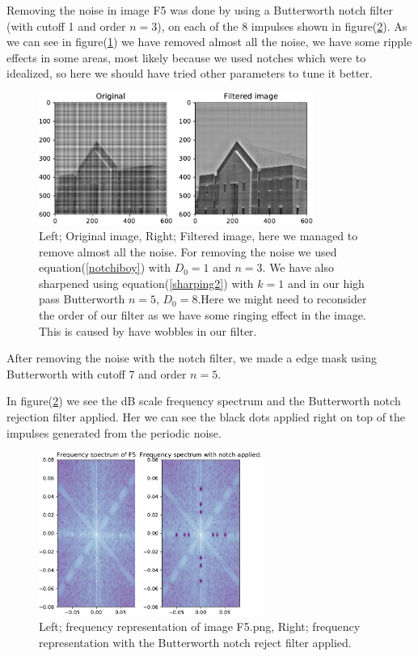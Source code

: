 {Removing the noise in image F5 was done by using a Butterworth notch filter (with cutoff 1 and order $n = 3$), on each of the 8 impulses shown in figure(\ref{F5notch}). As we can see in figure(\ref{C7F5}) we have removed almost all the noise, we have some ripple effects in some areas, most likely because we used notches which were to idealized, so here we should have tried other parameters to tune it better.


\begin{figure}[!htb]
    {\centering
        \includegraphics[width=0.80\textwidth]{C7F5.pdf}
        \caption{Left; Original image, Right; Filtered image, here we managed to remove almost all the noise. For removing the noise we used equation(\ref{notchiboy}) with $D_{0} = 1$ and $n = 3$. We have also sharpened using equation(\ref{sharping2}) with $k = 1$ and in our high pass Butterworth $n = 5$, $D_{0} = 8$.Here we might need to reconsider the order of our filter as we have some ringing effect in the image. This is caused by have wobbles in our filter.}
        \label{C7F5}
    \par}
    \end{figure}

After removing the noise with the notch filter, we made a edge mask using Butterworth with cutoff 7 and order $n = 5$.



In figure(\ref{F5notch}) we see the dB scale frequency spectrum and the Butterworth notch rejection filter applied. Her we can see the black dots applied right on top of the impulses generated from the periodic noise.

    \begin{figure}[!htb]
        {\centering
            \includegraphics[width=0.65\textwidth]{removed_per_noise_freq.pdf}
            \caption{Left; frequency representation of image F5.png, Right; frequency representation with the Butterworth notch reject filter applied.}
            \label{F5notch}
        \par}
        \end{figure}




}
